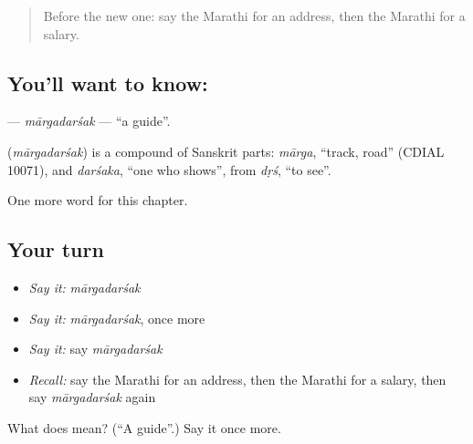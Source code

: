 \label{lesson:MR-C212-margadarsak}



\begin{quote}
Before the new one: say the Marathi for an address, then the Marathi for a salary.
\end{quote}

\subsection*{You'll want to know: }
\textbf{} — \emph{mārgadarśak} — \textquotedblleft{}a guide\textquotedblright{}.

\begin{cousinweb}
\textbf{} (\emph{mārgadarśak}) is a compound of Sanskrit parts: \emph{mārga}, \textquotedblleft{}track, road\textquotedblright{} (CDIAL 10071), and \emph{darśaka}, \textquotedblleft{}one who shows\textquotedblright{}, from \emph{dṛś}, \textquotedblleft{}to see\textquotedblright{}.
\end{cousinweb}

\begin{grammarlens}[title={What you've built}]
One more word for this chapter.
\end{grammarlens}

\subsection*{Your turn}
\begin{itemize}
\raggedright
  \item \emph{Say it:} \emph{mārgadarśak}
  \item \emph{Say it:} \emph{mārgadarśak}, once more
  \item \emph{Say it:} say \emph{mārgadarśak}
  \item \emph{Recall:} say the Marathi for an address, then the Marathi for a salary, then say \emph{mārgadarśak} again
\end{itemize}

\begin{tcolorbox}[breakable,colback=teal!4,colframe=teal!35!black,title={Before you move on}]
What does  mean? (\textquotedblleft{}A guide\textquotedblright{}.) Say it once more.
\end{tcolorbox}
